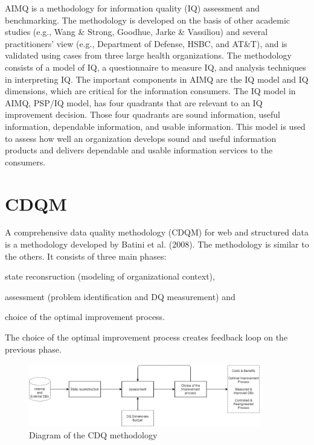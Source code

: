 AIMQ is a methodology for information quality (IQ) assessment and benchmarking.
The methodology is developed on the basis of other academic studies (e.g., Wang \& Strong, Goodhue, Jarke \& Vassiliou) and several practitioners’ view (e.g., Department of Defense, HSBC, and AT\&T), and is validated using cases from three large health organizations.
The methodology consists of a model of IQ, a questionnaire to measure IQ, and analysis techniques in interpreting IQ.
The important components in AIMQ are the IQ model and IQ dimensions, which are critical for the information consumers.
The IQ model in AIMQ, PSP/IQ model, has four quadrants that are relevant to an IQ improvement decision.
Those four quadrants are sound information, useful information, dependable information, and usable information.
This model is used to assess how well an organization develops sound and useful information products and delivers dependable and usable information services to the consumers.

\section{CDQM}

A comprehensive data quality methodology (CDQM) for web and structured data is a methodology developed by Batini et al. (2008).
The methodology is similar to the others.
It consists of three main phases: 
\begin{enumerate*}[label=(\roman*)]
    \item state reconsruction (modeling of organizational context),
    \item assessment (problem identification and DQ measurement) and
    \item choice of the optimal improvement process.
\end{enumerate*}

The choice of the optimal improvement process creates feedback loop on the previous phase.

\begin{figure}[htb]
    \centering
    \includegraphics[width=0.9\textwidth]{figures/cdqm-diagram.png}
    \caption{Diagram of the CDQ methodology~\cite{batini2008}}
    \label{fig:cdqm-diagram}
\end{figure}
\FloatBarrier

